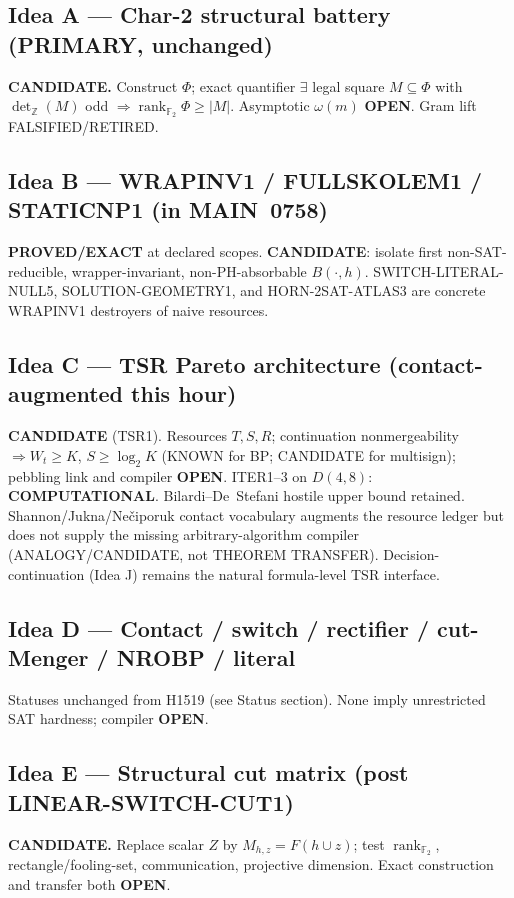 \documentclass[11pt]{article}
\begin{document}
\subsection*{Idea A --- Char-2 structural battery (PRIMARY, unchanged)}
\textbf{CANDIDATE.} Construct $\Phi$; exact quantifier
$\exists$ legal square $M\subseteq\Phi$ with $\det_{\mathbb Z}(M)$ odd
$\Rightarrow\operatorname{rank}_{\mathbb F_2}\Phi\ge|M|$. Asymptotic $\omega(m)$ \textbf{OPEN}.
Gram lift FALSIFIED/RETIRED.

\subsection*{Idea B --- WRAPINV1 / FULLSKOLEM1 / STATICNP1 (in MAIN~0758)}
\textbf{PROVED/EXACT} at declared scopes.
\textbf{CANDIDATE}: isolate first non-SAT-reducible, wrapper-invariant, non-PH-absorbable $B(\cdot,h)$.
SWITCH-LITERAL-NULL5, SOLUTION-GEOMETRY1, and HORN-2SAT-ATLAS3
are concrete WRAPINV1 destroyers of naive resources.

\subsection*{Idea C --- TSR Pareto architecture (contact-augmented this hour)}
\textbf{CANDIDATE} (TSR1). Resources $T,S,R$; continuation nonmergeability $\Rightarrow W_t\ge K$,
$S\ge\log_2 K$ (KNOWN for BP; CANDIDATE for multisign); pebbling link and compiler \textbf{OPEN}.
ITER1--3 on $D(4,8)$: \textbf{COMPUTATIONAL}. Bilardi--De~Stefani hostile upper bound retained.
Shannon/Jukna/Ne\v{c}iporuk contact vocabulary augments the resource ledger but does not
supply the missing arbitrary-algorithm compiler (ANALOGY/CANDIDATE, not THEOREM TRANSFER).
Decision-continuation (Idea J) remains the natural formula-level TSR interface.

\subsection*{Idea D --- Contact / switch / rectifier / cut-Menger / NROBP / literal}
Statuses unchanged from H1519 (see Status section). None imply unrestricted SAT hardness;
compiler \textbf{OPEN}.

\subsection*{Idea E --- Structural cut matrix (post LINEAR-SWITCH-CUT1)}
\textbf{CANDIDATE.} Replace scalar $Z$ by $M_{h,z}=F(h\cup z)$; test
$\operatorname{rank}_{\mathbb F_2}$, rectangle/fooling-set, communication, projective dimension.
Exact construction and transfer both \textbf{OPEN}.
\end{document}
